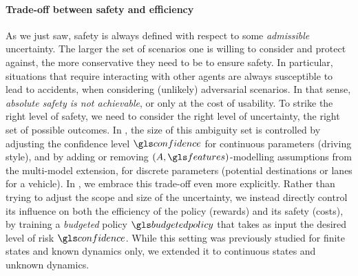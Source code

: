 \paragraph{Trade-off between safety and efficiency}
As we just saw, safety is always defined with respect to some \emph{admissible} uncertainty. The larger the set of scenarios one is willing to consider and protect against, the more conservative they need to be to ensure safety. In particular, situations that require interacting with other agents are always susceptible to lead to accidents, when considering (unlikely) adversarial scenarios. In that sense, \emph{absolute safety is not achievable}, or only at the cost of usability. To strike the right level of safety, we need to consider the right level of uncertainty, the right set of possible outcomes. In , the size of this ambiguity set is controlled by adjusting the confidence level $\confidence$ for continuous parameters (\eg driving style), and by adding or removing $(A,\features)$-modelling assumptions from the multi-model extension, for discrete parameters (\eg potential destinations or lanes for a vehicle). In , we embrace this trade-off even more explicitly. Rather than trying to adjust the scope and size of the uncertainty, we instead directly control its influence on both the efficiency of the policy (rewards) and its safety (costs), by training a \emph{budgeted} policy $\budgetedpolicy$ that takes as input the desired level of risk $\confidence$. While this setting was previously studied for finite states and known dynamics only, we extended it to continuous states and unknown dynamics.


